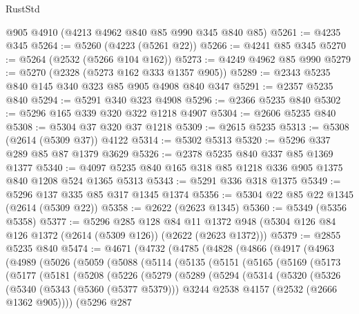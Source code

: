 \begin{lexlean}{RustStd}
\begin{coremodule}
    @905
    @4910
    (@4213 @4962 @840 @85 @990 @345 @840 @85)
@5261 := @4235 @345
@5264 := @5260 (@4223 (@5261 @22))
@5266 := @4241 @85 @345
@5270 := @5264 (@2532 (@5266 @104 @162))
@5273 := @4249 @4962 @85 @990
@5279 := @5270 (@2328 (@5273 @162 @333 @1357 @905))
@5289 := @2343 @5235 @840 @145 @340 @323 @85 @905 @4908 @840 @347
@5291 := @2357 @5235 @840
@5294 := @5291 @340 @323 @4908
@5296 := @2366 @5235 @840
@5302 := @5296 @165 @339 @320 @322 @1218 @4907
@5304 := @2606 @5235 @840
@5308 := @5304 @37 @320 @37 @1218
@5309 := @2615 @5235
@5313 := @5308 (@2614 (@5309 @37)) @4122
@5314 := @5302 @5313
@5320 := @5296 @337 @289 @85 @87 @1379 @3629
@5326 := @2378 @5235 @840 @337 @85 @1369 @1377
@5340 := @4097 @5235 @840 @165 @318 @85 @1218 @336 @905 @1375 @840 @1208 @524 @1365 @5313
@5343 := @5291 @336 @318 @1375
@5349 := @5296 @137 @335 @85 @317 @1345 @1374
@5356 := @5304 @22 @85 @22 @1345 (@2614 (@5309 @22))
@5358 := @2622 (@2623 @1345)
@5360 := @5349 (@5356 @5358)
@5377 := @5296
    @285
    @128
    @84
    @11
    @1372
    @948
    (@5304 @126 @84 @126 @1372 (@2614 (@5309 @126)) (@2622 (@2623 @1372)))
@5379 := @2855 @5235 @840
@5474 := @4671
    (@4732
      (@4785
        (@4828
          (@4866
            (@4917
              (@4963
                (@4989
                  (@5026
                    (@5059
                      (@5088
                        (@5114
                          (@5135
                            (@5151
                              (@5165
                                (@5169
                                  (@5173
                                    (@5177
                                      (@5181
                                        (@5208
                                          (@5226
                                            (@5279
                                              (@5289
                                                (@5294
                                                  (@5314
                                                    (@5320
                                                      (@5326
                                                        (@5340
                                                          (@5343 (@5360 (@5377 @5379)))
                                                          @3244
                                                          @2538
                                                          @4157
                                                          (@2532 (@2666 @1362 @905))))
                                                      (@5296
                                                        @287

\end{coremodule}
\end{lexlean}
